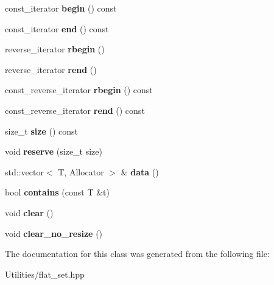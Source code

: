 \begin{DoxyCompactItemize}
\item 
\hypertarget{classflat__set_af86fd56851cc79707b8047f41515e6e5}{const\+\_\+iterator {\bfseries begin} () const }\label{classflat__set_af86fd56851cc79707b8047f41515e6e5}

\item 
\hypertarget{classflat__set_adfb11e89187e89ad311e757483434e11}{const\+\_\+iterator {\bfseries end} () const }\label{classflat__set_adfb11e89187e89ad311e757483434e11}

\item 
\hypertarget{classflat__set_a3f332e9e1a8230e39a889fb6767f5c3a}{reverse\+\_\+iterator {\bfseries rbegin} ()}\label{classflat__set_a3f332e9e1a8230e39a889fb6767f5c3a}

\item 
\hypertarget{classflat__set_a31c60bdf0b34dddf9320823989346100}{reverse\+\_\+iterator {\bfseries rend} ()}\label{classflat__set_a31c60bdf0b34dddf9320823989346100}

\item 
\hypertarget{classflat__set_a3cd547467d9e3e7d5b9c090f11416ea5}{const\+\_\+reverse\+\_\+iterator {\bfseries rbegin} () const }\label{classflat__set_a3cd547467d9e3e7d5b9c090f11416ea5}

\item 
\hypertarget{classflat__set_a657c70613a6df781ddfb7acaf5accab3}{const\+\_\+reverse\+\_\+iterator {\bfseries rend} () const }\label{classflat__set_a657c70613a6df781ddfb7acaf5accab3}

\item 
\hypertarget{classflat__set_a995982d56034fcfbe43d9d3e9453849d}{size\+\_\+t {\bfseries size} () const }\label{classflat__set_a995982d56034fcfbe43d9d3e9453849d}

\item 
\hypertarget{classflat__set_a9056b7f67544da53af05f1cf201df143}{void {\bfseries reserve} (size\+\_\+t size)}\label{classflat__set_a9056b7f67544da53af05f1cf201df143}

\item 
\hypertarget{classflat__set_a2b6cf8460b0962079651453fb40e57e8}{std\+::vector$<$ T, Allocator $>$ \& {\bfseries data} ()}\label{classflat__set_a2b6cf8460b0962079651453fb40e57e8}

\item 
\hypertarget{classflat__set_a822dbda7e154f6c74a465178561f2a17}{bool {\bfseries contains} (const T \&t)}\label{classflat__set_a822dbda7e154f6c74a465178561f2a17}

\item 
\hypertarget{classflat__set_ad86c71e5a1cda8a6381d908d1e4687eb}{void {\bfseries clear} ()}\label{classflat__set_ad86c71e5a1cda8a6381d908d1e4687eb}

\item 
\hypertarget{classflat__set_a86dfac5d359fbd179b144b79da3fb415}{void {\bfseries clear\+\_\+no\+\_\+resize} ()}\label{classflat__set_a86dfac5d359fbd179b144b79da3fb415}

\end{DoxyCompactItemize}


The documentation for this class was generated from the following file\+:\begin{DoxyCompactItemize}
\item 
Utilities/flat\+\_\+set.\+hpp\end{DoxyCompactItemize}
